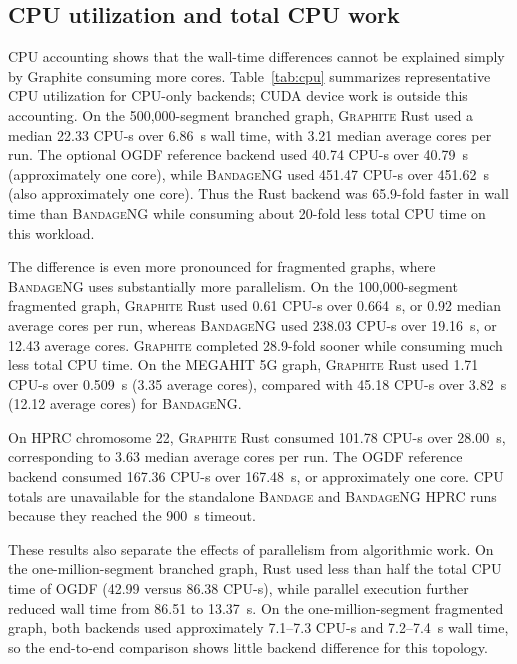 \documentclass[11pt]{article}
\newcommand{\graphite}{\textsc{Graphite}\xspace}
\newcommand{\bandage}{\textsc{Bandage}\xspace}
\newcommand{\bandageng}{\textsc{BandageNG}\xspace}
\begin{document}
\subsection{CPU utilization and total CPU work}
CPU accounting shows that the wall-time differences cannot be explained simply by Graphite consuming more cores. Table~\ref{tab:cpu} summarizes representative CPU utilization for CPU-only backends; CUDA device work is outside this accounting. On the 500,000-segment branched graph, \graphite Rust used a median 22.33 CPU-s over 6.86~s wall time, with 3.21 median average cores per run. The optional OGDF reference backend used 40.74 CPU-s over 40.79~s (approximately one core), while \bandageng used 451.47 CPU-s over 451.62~s (also approximately one core). Thus the Rust backend was 65.9-fold faster in wall time than \bandageng while consuming about 20-fold less total CPU time on this workload.

The difference is even more pronounced for fragmented graphs, where \bandageng uses substantially more parallelism. On the 100,000-segment fragmented graph, \graphite Rust used 0.61 CPU-s over 0.664~s, or 0.92 median average cores per run, whereas \bandageng used 238.03 CPU-s over 19.16~s, or 12.43 average cores. \graphite completed 28.9-fold sooner while consuming much less total CPU time. On the MEGAHIT 5G graph, \graphite Rust used 1.71 CPU-s over 0.509~s (3.35 average cores), compared with 45.18 CPU-s over 3.82~s (12.12 average cores) for \bandageng.

On HPRC chromosome 22, \graphite Rust consumed 101.78 CPU-s over 28.00~s, corresponding to 3.63 median average cores per run. The OGDF reference backend consumed 167.36 CPU-s over 167.48~s, or approximately one core. CPU totals are unavailable for the standalone \bandage and \bandageng HPRC runs because they reached the 900~s timeout.

These results also separate the effects of parallelism from algorithmic work. On the one-million-segment branched graph, Rust used less than half the total CPU time of OGDF (42.99 versus 86.38 CPU-s), while parallel execution further reduced wall time from 86.51 to 13.37~s. On the one-million-segment fragmented graph, both backends used approximately 7.1--7.3 CPU-s and 7.2--7.4~s wall time, so the end-to-end comparison shows little backend difference for this topology.
\end{document}
